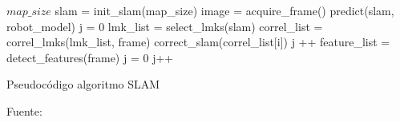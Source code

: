\begin{algorithm}[H]
\centering
    \begin{algorithmic}[1]
        \Require $map\_size$
        \vspace{1mm}
        \hline
        \vspace{1mm}
        \State slam = init\_slam(map\_size)
            \State image = acquire\_frame()
            \State predict(slam, robot\_model)
            \State j = 0
            \State lmk\_list = select\_lmks(slam)
            \State correl\_list = correl\_lmks(lmk\_list, frame)
                    \State correct\_slam(correl\_list[i])
                    \State j ++
                \EndIf
            \EndFor
            \State feature\_list = detect\_features(frame)
            \State j = 0
                    \State j++
                \EndIf
            \EndFor
        \EndFor
        \vspace{1mm}
    \hline
    \vspace{1mm}
    \end{algorithmic}
\caption{Pseudocódigo algoritmo SLAM}
Fuente: \cite{vslam_2018}
\label{alg:Algoritmo SLAM}
\end{algorithm}

